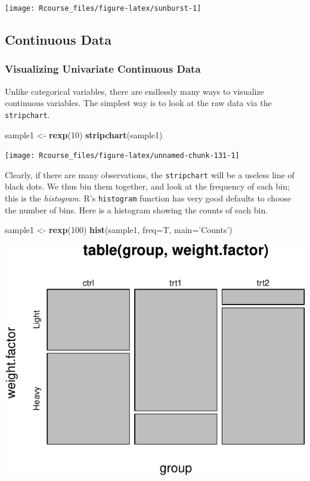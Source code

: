 \documentclass[]{book}
\newenvironment{Shaded}{\begin{snugshade}}{\end{snugshade}}
\newcommand{\DataTypeTok}[1]{\textcolor[rgb]{0.13,0.29,0.53}{#1}}
\newcommand{\DecValTok}[1]{\textcolor[rgb]{0.00,0.00,0.81}{#1}}
\newcommand{\KeywordTok}[1]{\textcolor[rgb]{0.13,0.29,0.53}{\textbf{#1}}}
\newcommand{\NormalTok}[1]{#1}
\newcommand{\StringTok}[1]{\textcolor[rgb]{0.31,0.60,0.02}{#1}}
\theoremstyle{definition}
\theoremstyle{definition}
\theoremstyle{definition}
\theoremstyle{remark}
\begin{document}
\texttt{[image: Rcourse\_files/figure-latex/sunburst-1]}

\hypertarget{continuous-data}{%
\subsection{Continuous Data}\label{continuous-data}}

\hypertarget{visualizing-univariate-continuous-data}{%
\subsubsection{Visualizing Univariate Continuous Data}\label{visualizing-univariate-continuous-data}}

Unlike categorical variables, there are endlessly many ways to visualize continuous variables.
The simplest way is to look at the raw data via the \texttt{stripchart}.

\begin{Shaded}
\begin{Highlighting}[]
\NormalTok{sample1 <-}\StringTok{ }\KeywordTok{rexp}\NormalTok{(}\DecValTok{10}\NormalTok{)                             }
\KeywordTok{stripchart}\NormalTok{(sample1)}
\end{Highlighting}
\end{Shaded}

\texttt{[image: Rcourse\_files/figure-latex/unnamed-chunk-131-1]}

Clearly, if there are many observations, the \texttt{stripchart} will be a useless line of black dots.
We thus bin them together, and look at the frequency of each bin; this is the \emph{histogram}.
R's \texttt{histogram} function has very good defaults to choose the number of bins.
Here is a histogram showing the counts of each bin.

\begin{Shaded}
\begin{Highlighting}[]
\NormalTok{sample1 <-}\StringTok{ }\KeywordTok{rexp}\NormalTok{(}\DecValTok{100}\NormalTok{)                            }
\KeywordTok{hist}\NormalTok{(sample1, }\DataTypeTok{freq=}\NormalTok{T, }\DataTypeTok{main=}\StringTok{'Counts'}\NormalTok{)        }
\end{Highlighting}
\end{Shaded}

\includegraphics[width=0.5\linewidth]{Rcourse_files/figure-latex/unnamed-chunk-132-1}
\end{document}
